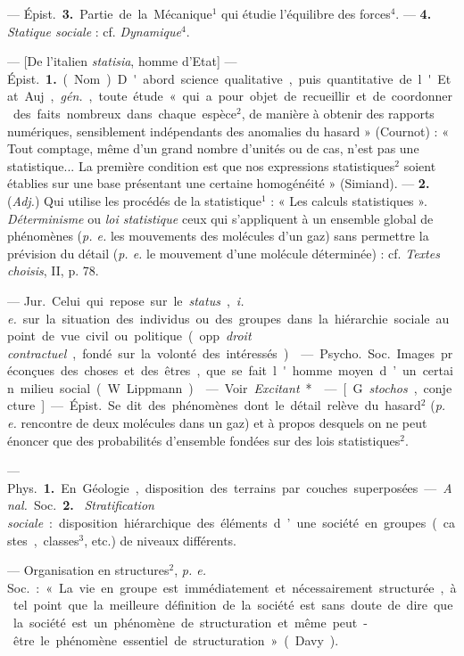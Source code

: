 \begin{itemize}[leftmargin=1cm, label=, itemsep=1pt]
 — \si{Épist.} {\bf 3.} Partie de la Mécanique$^1$ qui
étudie l’équilibre des forces$^4$. — {\bf 4.} {\it Statique sociale} : cf.
{\it Dynamique}$^4$.

 — [De l'italien {\it statisia}, homme d'Etat] — \si{Épist.}
{\bf 1.} (Nom). D'abord science qualitative, puis quantitative de l'Etat.
Auj., {\it gén.}, toute étude « qui a pour objet de recueillir et de
coordonner des faits nombreux dans chaque espèce$^2$, de manière à obtenir
des rapports numériques, sensiblement indépendants des anomalies du hasard
» (Cournot) : « Tout comptage, même d’un grand nombre d'unités ou de cas,
n’est pas une statistique... La première condition est que nos expressions
statistiques$^2$ soient établies sur une base présentant une certaine
homogénéité » (Simiand). — {\bf 2.} ({\it Adj.}) Qui utilise les procédés de
la statistique$^1$ : « Les calculs statistiques ». {\it Déterminisme} ou {\it
loi statistique} ceux qui s'appliquent à un ensemble global de phénomènes
({\it p. e.} les mouvements des molécules d’un gaz) sans permettre la
prévision du détail ({\it p. e.} le mouvement d’une molécule déterminée) :
 cf. {\it Textes choisis}, II, p. 78.

 — \si{Jur.} Celui qui repose sur le {\it status},
{\it i. e.} sur la situation des individus ou des groupes dans la hiérarchie
sociale au point de vue civil ou politique (opp. {\it droit
contractuel}, fondé sur la volonté des intéressés).

 — \si{Psycho.} \si{Soc.} Images préconçues des choses et des
êtres, que se fait l'homme moyen d’un certain milieu social (W. Lippmann).

 — Voir {\it Excitant}*.

 — [G. {\it stochos}, conjecture] — \si{Épist.} Se dit des
phénomènes
dont le détail relève du hasard$^2$ ({\it p. e.} rencontre de deux molécules
dans un gaz) et à propos desquels on ne peut énoncer que des probabilités
d'ensemble fondées sur des lois statistiques$^2$.

 — \si{Phys.} {\bf 1.} En Géologie, disposition des
terrains par couches superposées. — {\it Anal.} \si{Soc.} {\bf 2.} {\it
Stratification sociale} : disposition hiérarchique des éléments d’une société
en groupes (castes, classes$^3$, etc.) de niveaux différents.

 — Organisation en structures$^2$, {\it p. e.} \si{Soc.} :
« La vie en groupe est immédiatement et nécessairement structurée, à tel
point que la meilleure définition de la société est sans doute de dire que la
société est un phénomène de structuration et même peut-être le phénomène
essentiel de structuration » (Davy).


\end{itemize}
